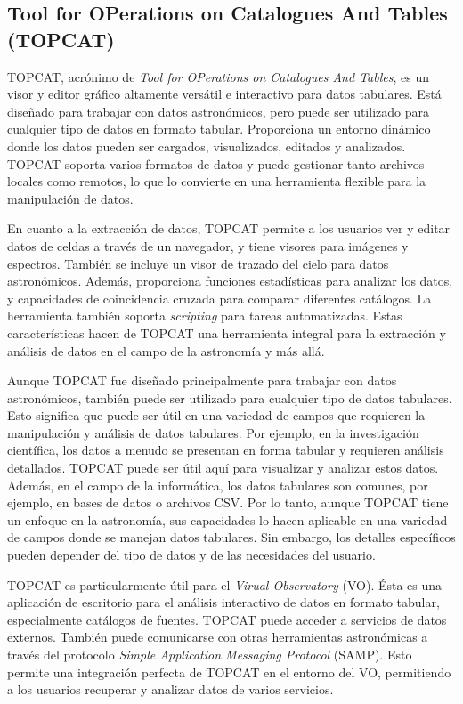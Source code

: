 \subsection{Tool for OPerations on Catalogues And Tables (TOPCAT)} \label{sec:tool_topcat}
TOPCAT, acrónimo de \textit{Tool for OPerations on Catalogues And Tables}, es un visor y editor gráfico altamente versátil e interactivo para datos tabulares. Está diseñado para trabajar con datos astronómicos, pero puede ser utilizado para cualquier tipo de datos en formato tabular. Proporciona un entorno dinámico donde los datos pueden ser cargados, visualizados, editados y analizados. TOPCAT soporta varios formatos de datos y puede gestionar tanto archivos locales como remotos, lo que lo convierte en una herramienta flexible para la manipulación de datos.\par

En cuanto a la extracción de datos, TOPCAT permite a los usuarios ver y editar datos de celdas a través de un navegador, y tiene visores para imágenes y espectros. También se incluye un visor de trazado del cielo para datos astronómicos. Además, proporciona funciones estadísticas para analizar los datos, y capacidades de coincidencia cruzada para comparar diferentes catálogos. La herramienta también soporta \textit{scripting} para tareas automatizadas. Estas características hacen de TOPCAT una herramienta integral para la extracción y análisis de datos en el campo de la astronomía y más allá.\par

Aunque TOPCAT fue diseñado principalmente para trabajar con datos astronómicos, también puede ser utilizado para cualquier tipo de datos tabulares. Esto significa que puede ser útil en una variedad de campos que requieren la manipulación y análisis de datos tabulares.  Por ejemplo, en la investigación científica, los datos a menudo se presentan en forma tabular y requieren análisis detallados. TOPCAT puede ser útil aquí para visualizar y analizar estos datos. Además, en el campo de la informática, los datos tabulares son comunes, por ejemplo, en bases de datos o archivos CSV. Por lo tanto, aunque TOPCAT tiene un enfoque en la astronomía, sus capacidades lo hacen aplicable en una variedad de campos donde se manejan datos tabulares. Sin embargo, los detalles específicos pueden depender del tipo de datos y de las necesidades del usuario.\par

TOPCAT es particularmente útil para el \textit{Virual Observatory} (VO). Ésta es una aplicación de escritorio para el análisis interactivo de datos en formato tabular, especialmente catálogos de fuentes. TOPCAT puede acceder a servicios de datos externos. También puede comunicarse con otras herramientas astronómicas a través del protocolo \textit{Simple Application Messaging Protocol} (SAMP). Esto permite una integración perfecta de TOPCAT en el entorno del VO, permitiendo a los usuarios recuperar y analizar datos de varios servicios.\par

